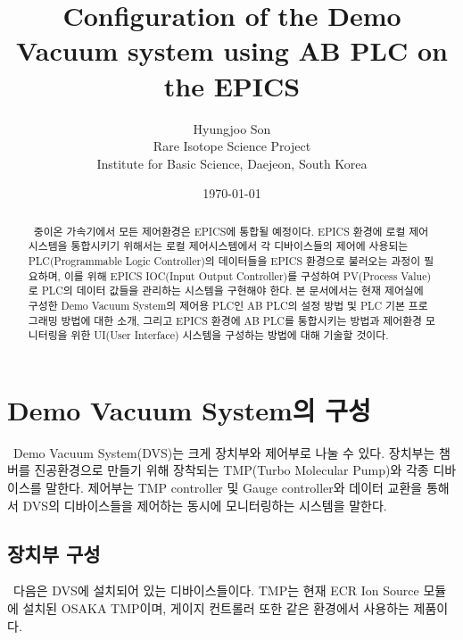 \documentclass[11pt
  , a4paper
  , article
  , oneside
]{memoir}
\begin{document}
	
\newcommand{\technumber}{
  RAON Control-Document Series\\
  Revision : v1.0,   Release : January 21, 2016}
\title{\textbf{Configuration of the Demo Vacuum system using AB PLC on the EPICS}}

\author{Hyungjoo Son \\

  Rare Isotope Science Project\\
  Institute for Basic Science, Daejeon, South Korea
}
\date{\today}

\renewcommand{\maketitlehooka}{\begin{flushright}\textsf{\technumber}\end{flushright}}

\maketitle

\begin{abstract}\
  중이온 가속기에서 모든 제어환경은 EPICS에 통합될 예정이다. EPICS 환경에 로컬 제어시스템을 통합시키기 위해서는 로컬 제어시스템에서 각 디바이스들의 제어에 사용되는 PLC(Programmable Logic Controller)의 데이터들을 EPICS 환경으로 불러오는 과정이 필요하며, 이를 위해 EPICS IOC(Input Output Controller)를 구성하여 PV(Process Value)로 PLC의 데이터 값들을 관리하는 시스템을 구현해야 한다. 
  본 문서에서는 현재 제어실에 구성한 Demo Vacuum System의 제어용 PLC인 AB PLC의 설정 방법 및 PLC 기본 프로그래밍 방법에 대한 소개, 그리고 EPICS 환경에 AB PLC를 통합시키는 방법과 제어환경 모니터링을 위한 UI(User Interface) 시스템을 구성하는 방법에 대해 기술할 것이다.
\end{abstract}

\chapter{Demo Vacuum System의 구성}\
Demo Vacuum System(DVS)는 크게 장치부와 제어부로 나눌 수 있다. 장치부는 챔버를 진공환경으로 만들기 위해 장착되는 TMP(Turbo Molecular Pump)와 각종 디바이스를 말한다. 제어부는 TMP controller 및 Gauge controller와 데이터 교환을 통해서 DVS의 디바이스들을 제어하는 동시에 모니터링하는 시스템을 말한다.

\section{장치부 구성}\
다음은 DVS에 설치되어 있는 디바이스들이다. TMP는 현재 ECR Ion Source 모듈에 설치된 OSAKA TMP이며, 게이지 컨트롤러 또한 같은 환경에서 사용하는 제품이다.
\end{document}
